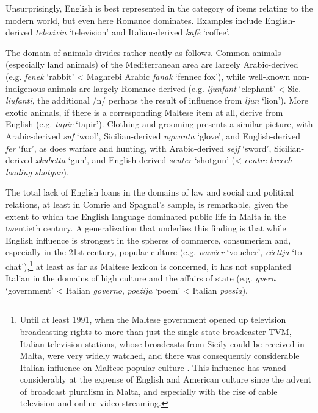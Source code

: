 \documentclass[output=paper]{langsci/langscibook}
\begin{document}
Unsurprisingly, English is best represented in the category of items relating to the modern world, but even here Romance dominates. Examples include English-derived \textit{televixin} `television' and Italian-derived \textit{kafè} `coffee'. 

The domain of animals divides rather neatly as follows. Common animals (especially land animals) of the Mediterranean area are largely Arabic-derived (e.g. \textit{fenek} `rabbit' < Maghrebi Arabic \textit{fanak} `fennec fox'), while well-known non-indigenous animals are largely Romance-derived (e.g. \textit{ljunfant} `elephant' < Sic. \textit{liufanti}, the additional /n/ perhaps the result of influence from \textit{ljun} `lion'). More exotic animals, if there is a corresponding Maltese item at all, derive from English (e.g. \textit{tapir} `tapir'). Clothing and grooming presents a similar picture, with Arabic-derived \textit{suf} `wool', Sicilian-derived \textit{ngwanta} `glove', and English-derived \textit{fer} `fur', as does warfare and hunting, with Arabic-derived \textit{sejf} `sword', Sicilian-derived \textit{xkubetta} `gun', and English-derived \textit{senter} `shotgun' (< \textit{centre-breech-loading shotgun}).

The total lack of English loans in the domains of law and social and political relations, at least in Comrie and Spagnol's sample, is remarkable, given the extent to which the English language dominated public life in Malta in the twentieth century. A generalization that underlies this finding is that while English influence is strongest in the spheres of commerce, consumerism and, especially in the 21st century, popular culture (e.g. \textit{vawċer} `voucher', \textit{ċċettja} `to chat'),\footnote{Until at least 1991, when the Maltese government opened up television broadcasting rights to more than just the single state broadcaster TVM, Italian television stations, whose broadcasts from Sicily could be received in Malta, were very widely watched, and there was consequently considerable Italian influence on Maltese popular culture \citep{sammut2007}. This influence has waned considerably at the expense of English and American culture since the advent of broadcast pluralism in Malta, and especially with the rise of cable television and online video streaming.} at least as far as Maltese lexicon is concerned, it has not supplanted Italian in the domains of high culture and the affairs of state (e.g. \textit{gvern} `government' < Italian \textit{governo}, \textit{poeżija} `poem' < Italian \textit{poesia}).
\end{document}
